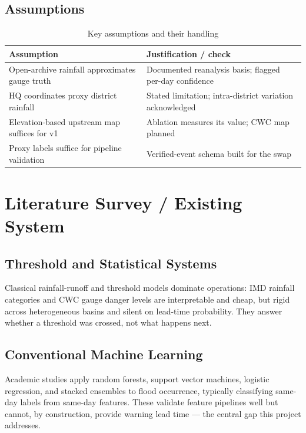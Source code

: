 \documentclass[a4paper,12pt]{report}
\begin{document}
\section{Assumptions}
\begin{table}[H]
\centering
\renewcommand{\arraystretch}{1.3}
\begin{tabularx}{\textwidth}{|>{\raggedright\arraybackslash}p{4.2cm}|X|}
\hline
\textbf{Assumption} & \textbf{Justification / check} \\ \hline
Open-archive rainfall approximates gauge truth & Documented reanalysis basis; flagged per-day confidence \\ \hline
HQ coordinates proxy district rainfall & Stated limitation; intra-district variation acknowledged \\ \hline
Elevation-based upstream map suffices for v1 & Ablation measures its value; CWC map planned \\ \hline
Proxy labels suffice for pipeline validation & Verified-event schema built for the swap \\ \hline
\end{tabularx}
\caption{Key assumptions and their handling}
\label{tab:assumptions}
\end{table}

\chapter{Literature Survey / Existing System}
\section{Threshold and Statistical Systems}
Classical rainfall-runoff and threshold models dominate operations: IMD rainfall categories and CWC gauge danger levels are interpretable and cheap, but rigid across heterogeneous basins and silent on lead-time probability. They answer whether a threshold was crossed, not what happens next.

\section{Conventional Machine Learning}
Academic studies apply random forests, support vector machines, logistic regression, and stacked ensembles to flood occurrence, typically classifying same-day labels from same-day features. These validate feature pipelines well but cannot, by construction, provide warning lead time --- the central gap this project addresses.
\end{document}
